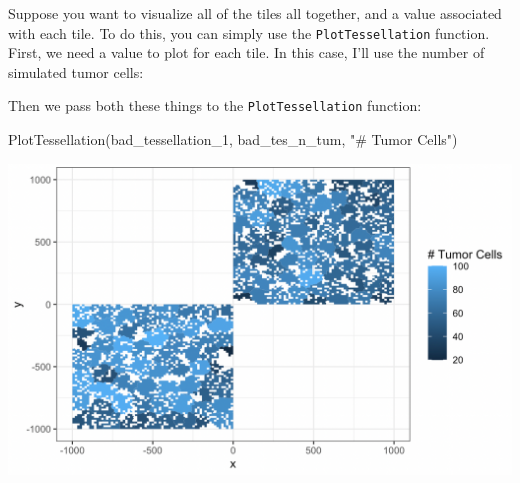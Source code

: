 \documentclass[
]{book}
\newenvironment{Shaded}{\begin{snugshade}}{\end{snugshade}}
\newcommand{\CommentTok}[1]{\textcolor[rgb]{0.56,0.35,0.01}{\textit{#1}}}
\newcommand{\DecValTok}[1]{\textcolor[rgb]{0.00,0.00,0.81}{#1}}
\newcommand{\FunctionTok}[1]{\textcolor[rgb]{0.00,0.00,0.00}{#1}}
\newcommand{\NormalTok}[1]{#1}
\newcommand{\OtherTok}[1]{\textcolor[rgb]{0.56,0.35,0.01}{#1}}
\newcommand{\SpecialCharTok}[1]{\textcolor[rgb]{0.00,0.00,0.00}{#1}}
\newcommand{\StringTok}[1]{\textcolor[rgb]{0.31,0.60,0.02}{#1}}
\begin{document}
Suppose you want to visualize all of the tiles all together, and a value associated with each tile. To do this, you can simply use the \texttt{PlotTessellation} function. First, we need a value to plot for each tile. In this case, I'll use the number of simulated tumor cells:

\begin{Shaded}
\end{Shaded}

Then we pass both these things to the \texttt{PlotTessellation} function:

\begin{Shaded}
\begin{Highlighting}[]
\FunctionTok{PlotTessellation}\NormalTok{(bad\_tessellation\_1, bad\_tes\_n\_tum, }\StringTok{"\# Tumor Cells"}\NormalTok{)}
\end{Highlighting}
\end{Shaded}

\includegraphics[width=17.14in]{Figures/Package Figs/bad_heatmap}
\end{document}
